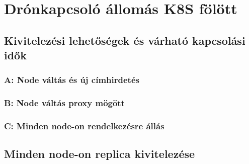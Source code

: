 \chapter{Drónkapcsoló állomás K8S fölött}

\section{Kivitelezési lehetőségek és várható kapcsolási idők}
\subsection{A: Node váltás és új címhirdetés}
\subsection{B: Node váltás proxy mögött}
\subsection{C: Minden node-on rendelkezésre állás}

\section{Minden node-on replica kivitelezése}